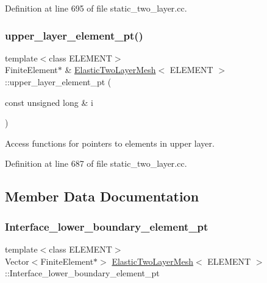 Definition at line 695 of file static\+\_\+two\+\_\+layer.\+cc.

\mbox{\label{classElasticTwoLayerMesh_ab5b2682b701b796c14431f8e126457fd}} 
\subsubsection{\texorpdfstring{upper\+\_\+layer\+\_\+element\+\_\+pt()}{upper\_layer\_element\_pt()}}
{\footnotesize\ttfamily template$<$class E\+L\+E\+M\+E\+NT$>$ \\
Finite\+Element$\ast$ \& \hyperlink{classElasticTwoLayerMesh}{Elastic\+Two\+Layer\+Mesh}$<$ E\+L\+E\+M\+E\+NT $>$\+::upper\+\_\+layer\+\_\+element\+\_\+pt (\begin{DoxyParamCaption}\item[{const unsigned long \&}]{i }\end{DoxyParamCaption})\hspace{0.3cm}{\ttfamily [inline]}}



Access functions for pointers to elements in upper layer. 



Definition at line 687 of file static\+\_\+two\+\_\+layer.\+cc.



\subsection{Member Data Documentation}
\mbox{\label{classElasticTwoLayerMesh_abc8751d632399afe56df6c32e1001582}} 
\subsubsection{\texorpdfstring{Interface\+\_\+lower\+\_\+boundary\+\_\+element\+\_\+pt}{Interface\_lower\_boundary\_element\_pt}}
{\footnotesize\ttfamily template$<$class E\+L\+E\+M\+E\+NT$>$ \\
Vector$<$Finite\+Element$\ast$$>$ \hyperlink{classElasticTwoLayerMesh}{Elastic\+Two\+Layer\+Mesh}$<$ E\+L\+E\+M\+E\+NT $>$\+::Interface\+\_\+lower\+\_\+boundary\+\_\+element\+\_\+pt\hspace{0.3cm}{\ttfamily [private]}}




